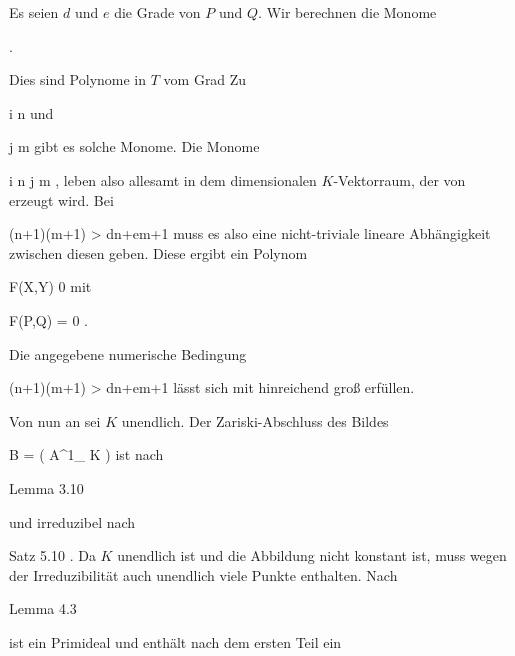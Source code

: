 {





Es seien $d$ und $e$ die Grade von $P$ und $Q$. Wir berechnen die Monome

 { . }

Dies sind Polynome in $T$ vom Grad
 Zu

\mavergleichskette
{\vergleichskette
{ i
}
{ \leq }{ n
}
{  }{
}
{    }{
}
{   }{
}
}
{}{}{}
und

\mavergleichskette
{\vergleichskette
{ j
}
{ \leq }{ m
}
{  }{
}
{    }{
}
{   }{
}
}
{}{}{}
gibt es
 solche Monome. Die Monome

 {}
 {i \leq n} {}
 {j \leq m} {} {} {,}
leben also allesamt in dem
dimensionalen $K$-Vektorraum, der von
 erzeugt wird. Bei

\mavergleichskette
{\vergleichskette
{ (n+1)(m+1)
}
{ > }{ dn+em+1
}
{  }{
}
{    }{
}
{   }{
}
}
{}{}{}
muss es also eine nicht-triviale lineare Abhängigkeit zwischen diesen
 geben. Diese ergibt ein Polynom

\mavergleichskette
{\vergleichskette
{ F(X,Y)
}
{ \neq }{ 0
}
{  }{
}
{    }{
}
{   }{
}
}
{}{}{}
mit

\mavergleichskette
{\vergleichskette
{ F(P,Q)
}
{ = }{ 0
}
{  }{
}
{    }{
}
{   }{
}
}
{}{}{.}

Die angegebene numerische Bedingung

\mavergleichskette
{\vergleichskette
{ (n+1)(m+1)
}
{ > }{ dn+em+1
}
{  }{
}
{    }{
}
{   }{
}
}
{}{}{}
lässt sich mit
 hinreichend groß erfüllen.

Von nun an sei $K$ unendlich. Der Zariski-Abschluss des Bildes

\mavergleichskette
{\vergleichskette
{ B
}
{ = }{ \varphi( {\mathbb A}^{1}_{ K })
}
{  }{
}
{    }{
}
{   }{
}
}
{}{}{}
ist
 nach

Lemma 3.10

und irreduzibel nach

Satz 5.10
.
Da $K$ unendlich ist und die Abbildung nicht konstant ist, muss wegen der Irreduzibilität auch
 unendlich viele Punkte enthalten. Nach

Lemma 4.3

ist
 ein Primideal und enthält nach dem ersten Teil ein

}
